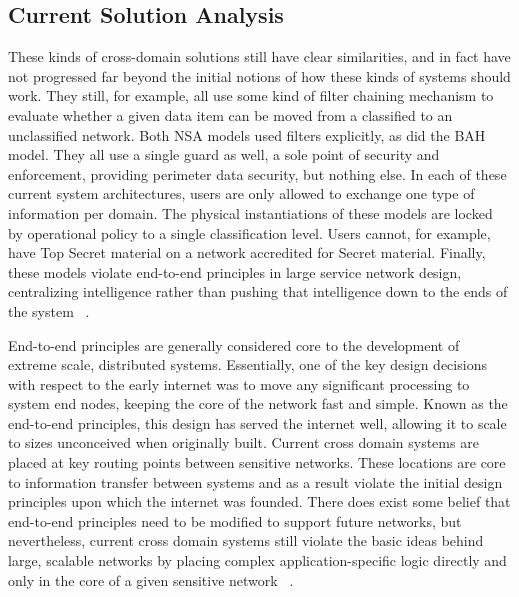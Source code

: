 \subsection{Current Solution Analysis}
These kinds of cross-domain solutions still have clear similarities, and in fact have not progressed far beyond the initial notions of how these kinds of systems should work.  They still, for example, all use some kind of filter chaining mechanism to evaluate whether a given data item can be moved from a classified to an unclassified network.  Both NSA models used filters explicitly, as did the BAH model.  They all use a single guard as well, a sole point of security and enforcement, providing perimeter data security, but nothing else.  In each of these current system architectures, users are only allowed to exchange one type of information per domain.  The physical instantiations of these models are locked by operational policy to a single classification level.  Users cannot, for example, have Top Secret material on a network accredited for Secret material.  Finally, these models violate end-to-end principles in large service network design, centralizing intelligence rather than pushing that intelligence down to the ends of the system ~\cite{Clark:1995:DPD:205447.205458}.

End-to-end principles are generally considered core to the development of extreme scale, distributed systems.  Essentially, one of the key design decisions with respect to the early internet was to move any significant processing to system end nodes, keeping the core of the network fast and simple.  Known as the end-to-end principles, this design has served the internet well, allowing it to scale to sizes unconceived when originally built.  Current cross domain systems are placed at key routing points between sensitive networks.  These locations are core to information transfer between systems and as a result violate the initial design principles upon which the internet was founded.  There does exist some belief that end-to-end principles need to be modified to support future networks, but nevertheless, current cross domain systems still violate the basic ideas behind large, scalable networks by placing complex application-specific logic directly and only in the core of a given sensitive network ~\cite{Blumenthal:2001:RDI:383034.383037}.

